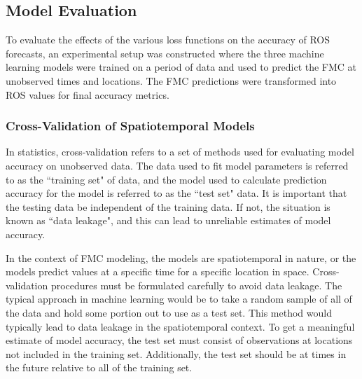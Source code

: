 \documentclass[11pt]{article}%
\begin{document}
\subsection{Model Evaluation}

To evaluate the effects of the various loss functions on the accuracy of ROS forecasts, an experimental setup was constructed where the three machine learning models were trained on a period of data and used to predict the FMC at unobserved times and locations. The FMC predictions were transformed into ROS values for final accuracy metrics. 

\subsubsection{Cross-Validation of Spatiotemporal Models}
\label{sec:cv}

In statistics, cross-validation refers to a set of methods used for evaluating model accuracy on unobserved data.\cite{Hastie-2010-ESL} The data used to fit model parameters is referred to as the ``training set" of data, and the model used to calculate prediction accuracy for the model is referred to as the ``test set" data. It is important that the testing data be independent of the training data. If not, the situation is known as ``data leakage", and this can lead to unreliable estimates of model accuracy.

In the context of FMC modeling, the models are spatiotemporal in nature, or the models predict values at a specific time for a specific location in space. Cross-validation procedures must be formulated carefully to avoid data leakage. The typical approach in machine learning would be to take a random sample of all of the data and hold some portion out to use as a test set. This method would typically lead to data leakage in the spatiotemporal context. To get a meaningful estimate of model accuracy, the test set must consist of observations at locations not included in the training set. Additionally, the test set should be at times in the future relative to all of the training set. 
\end{document}

